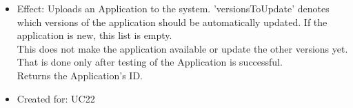 \begin{description}
\begin{itemize}[noitemsep,nolistsep,leftmargin=-.25cm]
        \begin{itemize}[noitemsep,nolistsep]
           \item Effect: Uploads an Application to the system. 'versionsToUpdate' denotes which versions of the application should be automatically updated. If the application is new, this list is empty. \\
This does not make the application available or update the other versions yet. That is done only after testing of the Application is successful. \\
Returns the Application's ID.
\item Created for: UC22
        \end{itemize}
    \end{itemize}
    \end{description}

